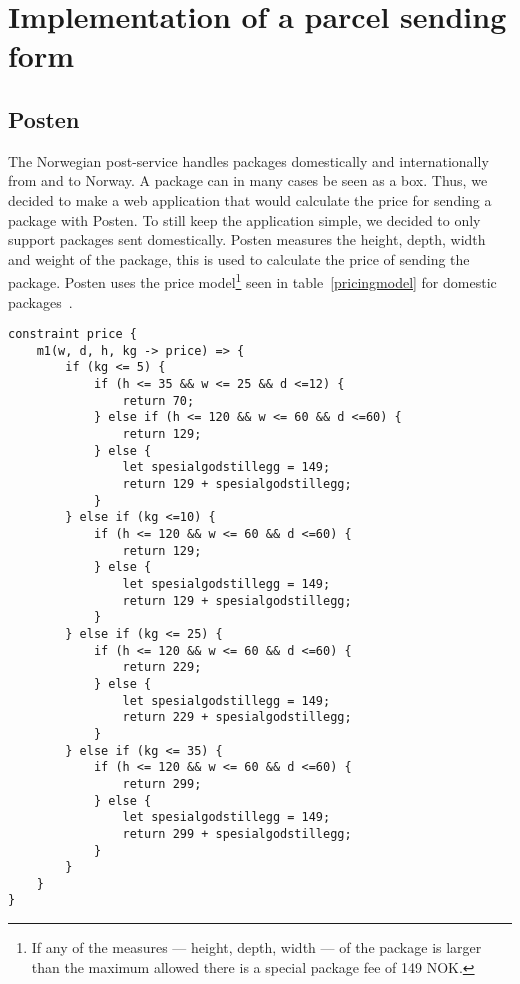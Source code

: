 \chapter{Implementation of a parcel sending form}

\section{Posten}
The Norwegian post-service handles packages domestically and internationally from 
and to Norway. A package can in many cases be seen as a box. Thus, we decided to make a web application that would calculate the price for sending a package with Posten. To still keep the application simple, we decided to only support packages sent domestically. Posten measures the height, depth, width and weight of the package, this is used to calculate the price of sending the package. Posten uses the price model\footnote{If any of the measures --- height, depth, width --- of the package is larger than the maximum allowed there is a special package fee of 149 NOK.} seen in table~\ref{pricingmodel} for domestic packages~\cite{postenNorgespakken}.

\begin{lstlisting}[caption={HotDrink logic for determining the price},label=hotdrinkprice, language=hotdrink]
constraint price {
    m1(w, d, h, kg -> price) => {
        if (kg <= 5) {
            if (h <= 35 && w <= 25 && d <=12) {
                return 70;
            } else if (h <= 120 && w <= 60 && d <=60) {
                return 129;
            } else {
                let spesialgodstillegg = 149;
                return 129 + spesialgodstillegg;
            }
        } else if (kg <=10) {
            if (h <= 120 && w <= 60 && d <=60) {
                return 129;
            } else {
                let spesialgodstillegg = 149;
                return 129 + spesialgodstillegg;
            }
        } else if (kg <= 25) {
            if (h <= 120 && w <= 60 && d <=60) {
                return 229;
            } else {
                let spesialgodstillegg = 149;
                return 229 + spesialgodstillegg;
            }
        } else if (kg <= 35) {
            if (h <= 120 && w <= 60 && d <=60) {
                return 299;
            } else {
                let spesialgodstillegg = 149;
                return 299 + spesialgodstillegg;
            }
        }
    }
}
\end{lstlisting}

